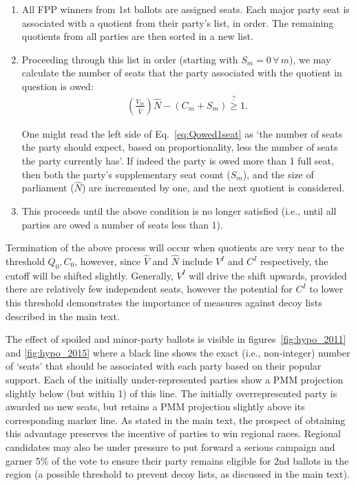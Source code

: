 \documentclass[DIV=calc, paper=a4, fontsize=11pt, twocolumn]{scrartcl}	 %
\begin{document}
\begin{enumerate}
\item All FPP winners from 1st ballots are assigned seats. 
Each major party seat is associated with a quotient from their party's list, in order. The remaining quotients from all parties are then sorted in a new list.

\item Proceeding through this list in order (starting with $S_m=0 \, \forall \, m$), we may calculate the number of seats that the party associated with the quotient in question is owed:
\begin{align}
\left(\frac{V_m}{\hat{V}}\right) \hat{N} -(C_m+S_m)\stackrel{?}{\ge} 1.
\label{eq:Qowed1seat}
\end{align} 

One might read the left side of Eq.~\ref{eq:Qowed1seat} as `the number of seats the party should expect, based on proportionality, less the number of seats the party currently has'.
If indeed the party is owed more than 1 full seat, then both the party's supplementary seat count ($S_m$), and the size of parliament ($\hat{N}$) are incremented by one, and the next quotient is considered. 

\item This proceeds until the above condition is no longer satisfied (i.e., until all parties are owed a number of seats less than 1). 
\end{enumerate}

Termination of the above process will occur when quotients are very near to the threshold $Q_0,C_0$, however, since $\hat{V}$ and $\hat{N}$ include $V^I$ and $C^I$ respectively, the cutoff will be shifted slightly.
Generally, $V^I$ will drive the shift upwards, provided there are relatively few independent seats, however the potential for $C^I$ to lower this threshold demonstrates the importance of measures against decoy lists described in the main text.

The effect of spoiled and minor-party ballots is visible in figures~\ref{fig:hypo_2011} and \ref{fig:hypo_2015} where a black line shows the exact (i.e., non-integer) number of `seats' that should be associated with each party based on their popular support. 
Each of the initially under-represented parties show a PMM projection slightly below (but within 1) of this line. The initially overrepresented party is awarded no new seats, but retains a PMM projection slightly above its corresponding marker line.
As stated in the main text, the prospect of obtaining this advantage preserves the incentive of parties to win regional races.
Regional candidates may also be under pressure to put forward a serious campaign and garner 5\% of the vote to ensure their party remains eligible for 2nd ballots in the region (a possible threshold to prevent decoy lists, as discussed in the main text). 
\end{document}
